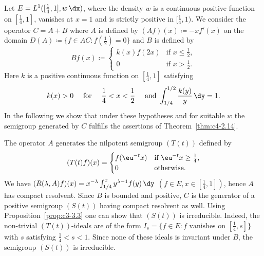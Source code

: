 \begin{example}\label{ex:c4-2.15}
Let $E = L^{1}([\frac{1}{4},1],w\,\dx)$, where the density $w$ is a continuous positive function on $[\frac{1}{4},1]$, vanishes at $x = 1$ and is strictly positive in $[\frac{1}{4},1)$.
We consider the operator $C = A + B$ where $A$ is defined by $(Af)(x) \coloneq  -xf'(x)$ on the domain $D(A) \coloneq \{f \in AC \colon f(\frac{1}{2}) = 0\}$ and $B$ is defined by
\begin{equation*}\label{eq:c4-2.12-kgk}
Bf(x) \coloneq \begin{cases}
    k(x)f(2x) & \text{if } x \leq \frac{1}{2}, \\
    0 & \text{if } x > \frac{1}{2}.
\end{cases}
\end{equation*}
Here $k$ is a positive continuous function on $[\frac{1}{4},1]$ satisfying
\begin{equation}\label{eq:c4-2.13}
k(x) > 0 \quad \text{ for } \quad \frac{1}{4} < x < \frac{1}{2} \quad \text{ and }  \int_{1/4}^{1/2} \frac{k(y)}{y} \, \dy = 1.
\end{equation}
In the following we show that under these hypotheses and for suitable $w$ the semigroup generated by $C$ fulfills the assertions of Theorem~\ref{thm:c4-2.14}.

The operator $A$ generates the nilpotent semigroup $(T(t))$ defined by
\begin{equation*}\label{eq:c4-2.13-kgk}
(T(t)f)(x) = \begin{cases}
    f(\eu^{-t}x) & \text{if } \eu^{-t}x \geq \frac{1}{4}, \\
    0 & \text{otherwise}.
\end{cases}
\end{equation*}
We have $(R(\lambda,A)f)(x) = x^{-\lambda}\int_{1/4}^{x} y^{\lambda-1}f(y) \, \dy$ $(f \in E, x \in [\frac{1}{4},1])$, hence $A$ has compact resolvent.
Since $B$ is bounded and positive, $C$ is the generator of a positive semigroup $(S(t))$ having compact resolvent as well.
Using Proposition~\ref{prop:c3-3.3}  one can show that $(S(t))$ is irreducible.
Indeed, the non-trivial $(T(t))$-ideals are of the form $I_{s} = \{f \in E \colon f \text{ vanishes on } [\frac{1}{4},s]\}$ with $s$ satisfying $\frac{1}{4} < s < 1$.
Since none of these ideals is invariant under $B$, the semigroup $(S(t))$ is irreducible.


\end{example}
